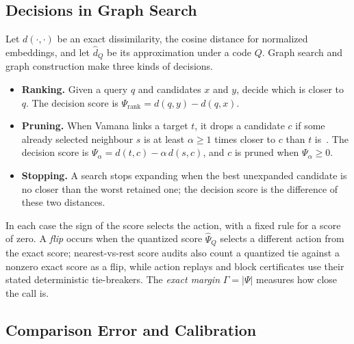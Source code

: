 \documentclass[twoside,11pt]{article}
\begin{document}
\subsection{Decisions in Graph Search}
\label{sec:decisions}

Let $d(\cdot,\cdot)$ be an exact dissimilarity, the cosine distance for normalized embeddings, and let $\hat d_Q$ be its approximation under a code $Q$. Graph search and graph construction make three kinds of decisions.
\begin{itemize}
\setlength{\itemsep}{2pt}
\setlength{\parsep}{0pt}
\item \textbf{Ranking.} Given a query $q$ and candidates $x$ and $y$, decide which is closer to $q$. The decision score is $\Psi_{\mathrm{rank}}=d(q,y)-d(q,x)$.
\item \textbf{Pruning.} When Vamana links a target $t$, it drops a candidate $c$ if some already selected neighbour $s$ is at least $\alpha\ge1$ times closer to $c$ than $t$ is~\citep{subramanya2019diskann}. The decision score is $\Psi_\alpha=d(t,c)-\alpha\,d(s,c)$, and $c$ is pruned when $\Psi_\alpha\ge0$.
\item \textbf{Stopping.} A search stops expanding when the best unexpanded candidate is no closer than the worst retained one; the decision score is the difference of these two distances.
\end{itemize}
In each case the sign of the score selects the action, with a fixed rule for a score of zero. A \emph{flip} occurs when the quantized score $\widehat\Psi_Q$ selects a different action from the exact score; nearest-vs-rest score audits also count a quantized tie against a nonzero exact score as a flip, while action replays and block certificates use their stated deterministic tie-breakers. The \emph{exact margin} $\Gamma=|\Psi|$ measures how close the call is.

\subsection{Comparison Error and Calibration}
\label{sec:calibration}
\end{document}
